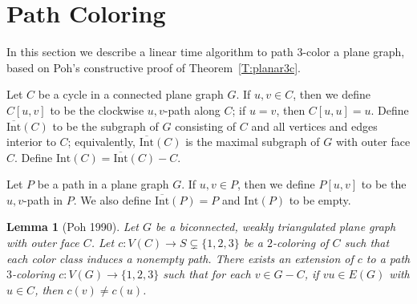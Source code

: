 \documentclass[12pt,letterpaper]{article}
\newcommand{\graphinto}{\text{Int}}
\newcommand{\graphintc}{\overline{\text{Int}}}
\theoremstyle{plain}
\newtheorem{lemma}{Lemma}[section]           %
\theoremstyle{definition}
\theoremstyle{break}
\begin{document}
\section{Path Coloring}\label{S:path_color}

In this section we describe a linear time algorithm to path $3$-color
a plane graph,
based on Poh's constructive proof of Theorem~\ref{T:planar3c}.

Let $C$ be a cycle in a connected plane graph $G$. If $u,v\in C$, then we define
$C[u,v]$ to be the clockwise $u,v$-path
along $C$; if $u=v$, then $C[u,u]=u$.
Define $\graphintc(C)$ to
be the subgraph of $G$ consisting of $C$ and all vertices and edges interior to
$C$; equivalently, $\graphintc(C)$ is the maximal subgraph of
$G$ with outer face $C$. Define $\graphinto(C)=\graphintc(C)-C$.

Let $P$ be a path in a plane graph $G$. If $u,v\in P$, then
we define $P[u,v]$ to be the $u,v$-path in $P$.
We also define $\graphintc(P)=P$ and $\graphinto(P)$ to be empty.

\begin{lemma}[Poh 1990]\label{L:planar3c}
Let $G$ be a biconnected, weakly triangulated plane graph with outer face
$C$. Let $c:V(C)\to S\subsetneq\{1,2,3\}$ be a $2$-coloring of $C$ such
that each color class induces a nonempty path. There exists an extension of
$c$ to a path $3$-coloring $c:V(G)\to\{1,2,3\}$ such that for each $v\in G-C$, if $vu\in
E(G)$ with $u\in C$, then $c(v)\ne c(u)$.
\end{lemma}
\end{document}
